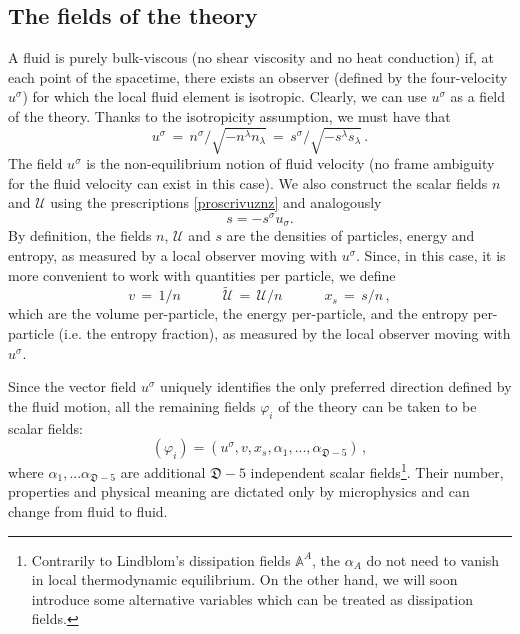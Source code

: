 \documentclass[a4paper, amsfonts, amssymb, amsmath, reprint, twocolumn, showkeys, nofootinbib]{revtex4-2}
\begin{document}
\subsection{The fields of the theory}\label{axsummiz}


A fluid is purely bulk-viscous (no shear viscosity and no heat conduction) if, at each point of the spacetime, there exists an observer (defined by the four-velocity $u^\sigma$) for which the local fluid element is isotropic. 
Clearly, we can use $u^\sigma$ as a field of the theory. Thanks to the isotropicity assumption, we must have that
\begin{equation}
u^\sigma \,=\, 
{n^\sigma}/{\sqrt{-n^\lambda n_\lambda}} \,=\, 
{s^\sigma}/{\sqrt{-s^\lambda s_\lambda}} \, .
\end{equation}
The field $u^\sigma$ is the non-equilibrium notion of fluid velocity (no frame ambiguity for the fluid velocity can exist in this case).
We also construct the scalar fields $n$ and $\mathcal{U}$ using the prescriptions \eqref{proscrivuznz} and analogously
\begin{equation}
s=-s^\sigma u_\sigma.
\end{equation} 
By definition, the fields $n$, $\mathcal{U}$ and $s$ are the densities of  particles, energy and entropy, as measured by a local observer moving with $u^\sigma$. Since, in this case, it is more convenient to work with quantities per particle, we define
\begin{equation}
v \,=\, {1}/{n}  
\quad \quad \quad    
\tilde{\mathcal{U}} \,=\,  {\mathcal{U}}/{n}  
\quad \quad \quad  
x_s \,=\,  {s}/{n} \, ,
\end{equation}
which are the volume per-particle, the energy per-particle, and the entropy per-particle (i.e. the entropy fraction), as measured by the local observer moving with $u^\sigma$.

Since the vector field $u^\sigma$ uniquely identifies the only preferred direction defined by the fluid motion, all the remaining fields $\varphi_i$ of the theory can be taken to be scalar fields:
\begin{equation}\label{DoFbelli}
(\varphi_i) = (u^\sigma,v,x_s,\alpha_1,...,\alpha_{\mathfrak{D}-5}) \, ,
\end{equation}
where $\alpha_1,...\alpha_{\mathfrak{D}-5}$ are additional $\mathfrak{D}-5$ independent scalar fields\footnote{
Contrarily to Lindblom's dissipation fields $\mathbb{A}^A$, the  $\alpha_A$ do not need to vanish in local thermodynamic equilibrium. On the other hand, we will soon introduce some alternative variables which can be treated as dissipation fields.
}. 
Their number, properties and physical meaning are dictated only by microphysics and can change from fluid to fluid. 
\end{document}
